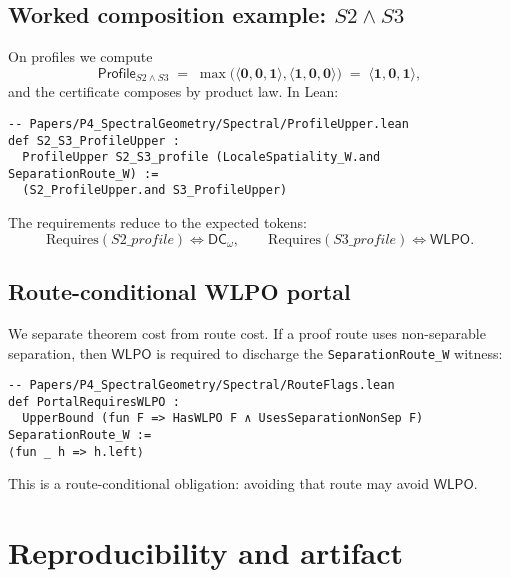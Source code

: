 \documentclass[11pt]{article}
\newcommand{\WLPO}{\mathsf{WLPO}}
\newcommand{\DCw}{\mathsf{DC}_{\omega}}
\newcommand{\hzero}{\mathbf{0}}
\newcommand{\hone}{\mathbf{1}}
\newcommand{\Profile}{\mathsf{Profile}}
\newcommand{\WLPOonly}{\langle \hone,\hzero,\hzero\rangle}
\newcommand{\DCwonly}{\langle \hzero,\hzero,\hone\rangle}
\newcommand{\lean}[1]{\texttt{#1}}
\theoremstyle{plain}
\theoremstyle{definition}
\theoremstyle{remark}
\begin{document}
\subsection{Worked composition example: \(S2 \wedge S3\)}
On profiles we compute
\[
  \Profile_{S2 \wedge S3}
  \;=\; \max\!\big(\DCwonly,\WLPOonly\big)
  \;=\; \langle \hone,\hzero,\hone\rangle,
\]
and the certificate composes by product law. In Lean:

\begin{lstlisting}
-- Papers/P4_SpectralGeometry/Spectral/ProfileUpper.lean
def S2_S3_ProfileUpper :
  ProfileUpper S2_S3_profile (LocaleSpatiality_W.and SeparationRoute_W) :=
  (S2_ProfileUpper.and S3_ProfileUpper)
\end{lstlisting}

The requirements reduce to the expected tokens:
\[
  \mathrm{Requires}(S2\_profile) \iff \DCw,\qquad
  \mathrm{Requires}(S3\_profile) \iff \WLPO.
\]

\subsection{Route-conditional WLPO portal}
We separate theorem cost from route cost. If a proof route uses non-separable
separation, then \(\WLPO\) is required to discharge the \lean{SeparationRoute\_W}
witness:

\begin{lstlisting}
-- Papers/P4_SpectralGeometry/Spectral/RouteFlags.lean
def PortalRequiresWLPO :
  UpperBound (fun F => HasWLPO F ∧ UsesSeparationNonSep F) SeparationRoute_W :=
⟨fun _ h => h.left⟩
\end{lstlisting}

This is a route-conditional obligation: avoiding that route may avoid \(\WLPO\).

\section{Reproducibility and artifact}
\end{document}
